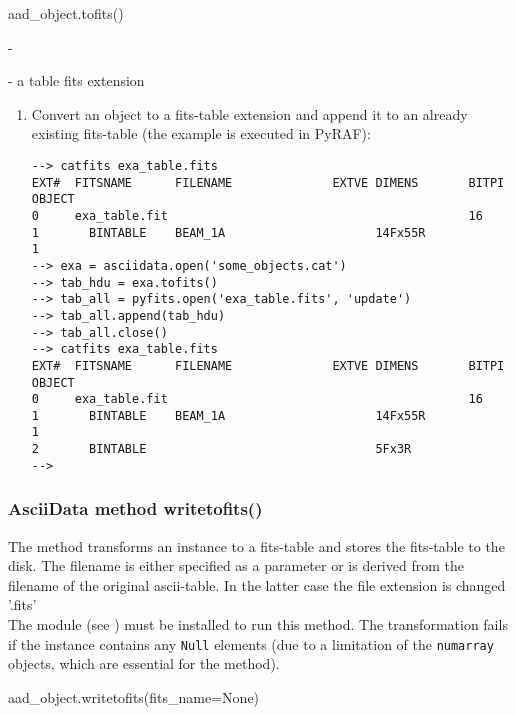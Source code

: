 aad\_object.tofits()

-

- a table fits extension

\begin{enumerate}
\item Convert an \ad object to a fits-table extension and append it to an
already existing fits-table (the example is executed in PyRAF):
\begin{small}
\begin{verbatim}
--> catfits exa_table.fits
EXT#  FITSNAME      FILENAME              EXTVE DIMENS       BITPI OBJECT
0     exa_table.fit                                          16
1       BINTABLE    BEAM_1A                     14Fx55R            1
--> exa = asciidata.open('some_objects.cat')
--> tab_hdu = exa.tofits()
--> tab_all = pyfits.open('exa_table.fits', 'update')
--> tab_all.append(tab_hdu)
--> tab_all.close()
--> catfits exa_table.fits
EXT#  FITSNAME      FILENAME              EXTVE DIMENS       BITPI OBJECT
0     exa_table.fit                                          16
1       BINTABLE    BEAM_1A                     14Fx55R            1
2       BINTABLE                                5Fx3R
-->
\end{verbatim}
\end{small}
\end{enumerate}

\subsubsection{AsciiData method writetofits()}
\label{adm_writetofits}
%
The method transforms an \ad instance to a fits-table and stores
the fits-table to the disk. The filename is either specified as a parameter
or is derived from the filename of the original ascii-table. In the latter
case the file extension is changed '.fits'\\
The module  (see )
must be installed to run this method. The transformation fails if the
\ad instance contains any {\tt Null} elements (due to a limitation
of the {\tt numarray} objects, which are essential for the method).

aad\_object.writetofits(fits\_name=None)


